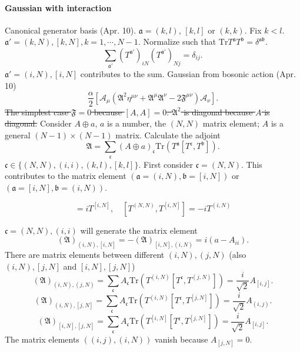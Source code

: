 
\paragraph{Gaussian with interaction}

Canonical generator basis (Apr. 10).
$\mathfrak{a}=(k,l)$, $[k,l] $ or $(k,k)$.
Fix $k<l$.
$\mathfrak{a}'=(k,N),[k,N],k=1,\cdots,N-1$.
Normalize such that $\mathrm{Tr}T^{\mathfrak{a}}T^{\mathfrak{b}} = 
\delta^{\mathfrak{a} \mathfrak{b}}$.
\[
	\sum_{\mathfrak{a}'}(T^{\mathfrak{a}'})_{iN} (T^{\mathfrak{a}'})_{Nj}
	=  \delta_{ij}
.\] 												
$\mathfrak{a}'=(i,N),[i,N]$ contributes to the sum.
Gaussian from bosonic action (Apr. 10)
\[
\frac{\alpha}{2} \left[ 
\mathcal{A}_\mu 
(\mathfrak{A}^2 \eta^{\mu\nu} + \mathfrak{A}^\mu \mathfrak{A}^\nu
- 2 \mathfrak{F}^{\mu\nu})
\mathcal{A}_\nu\right] 
.\] 
\sout{The simplest case $\mathfrak{F}=0$ because $[A,A]=0$.
$\mathfrak{A}^2$ is diagonal because $A$ is diagonal.}
Consider $A \oplus a$, $a$ is a number, the $(N,N)$ matrix element;
$A$ is a general $(N-1)\times(N-1)$ matrix.
Calculate the adjoint
\[
	\mathfrak{A} = \sum_{\mathfrak{c}} (A \oplus a)_{\mathfrak{c}}
	\mathrm{Tr}(T^{\mathfrak{a}} [T^{\mathfrak{c}},T^{\mathfrak{b}}])
.\] 
$\mathfrak{c}\in\{(N,N),(i,i),(k,l),[k,l]\}$.
First consider $\mathfrak{c}=(N,N)$.
This contributes to the matrix element
$(\mathfrak{a}=(i,N),\mathfrak{b}=[i,N])$
or $(\mathfrak{a}=[i,N],\mathfrak{b}=(i,N))$.
\begin{info}
	\begin{equation*}
		[T^{(N,N)},T^{(i,N)}] = i T^{[i,N]},\quad
		[T^{(N,N)},T^{[i,N]}] = -i T^{(i,N)}
	\end{equation*}
\end{info}
$\mathfrak{c}=(N,N),(i,i)$ will generate the matrix element
\[
	(\mathfrak{A})_{(i,N),[i,N]} = - (\mathfrak{A})_{[i,N],(i,N)}
	= i (a - A_{ii}) 
.\] 
There are matrix elements between different $(i,N),(j,N)$
(also $(i,N),[j,N]$ and $[i,N],[j,N]$)
\[
	(\mathfrak{A})_{(i,N),(j,N)} = \sum_{\mathfrak{c}}A_{\mathfrak{c}}
	\mathrm{Tr}(T^{(i,N)}[T^{\mathfrak{c}},T^{(j,N)}])
	= \frac{i}{\sqrt{2}}A_{[i,j]}
.\] 
\[
	(\mathfrak{A})_{(i,N),[j,N]} = \sum_{\mathfrak{c}}A_{\mathfrak{c}}
	\mathrm{Tr}(T^{(i,N)}[T^{\mathfrak{c}},T^{[j,N]}])
	= \frac{i}{\sqrt{2}}A_{(i,j)}
.\] 
\[
	(\mathfrak{A})_{[i,N],[j,N]} = \sum_{\mathfrak{c}}A_{\mathfrak{c}}
	\mathrm{Tr}(T^{[i,N]}[T^{\mathfrak{c}},T^{[j,N]}])
	= \frac{i}{\sqrt{2}}A_{[i,j]}
.\] 
The matrix elements $((i,j),(i,N))$ vanish because $A_{[j,N]}=0$.

